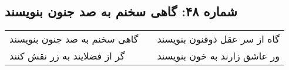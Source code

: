 \begin{center}
\section*{شماره ۴۸: گاهی سخنم به صد جنون بنویسند}
\label{sec:048}
\begin{longtable}{l p{0.5cm} r}
گاهی سخنم به صد جنون بنویسند
&&
گاه از سر عقل ذوفنون بنویسند
\\
گر از فضلایند به زر نقش کنند
&&
ور عاشق زارند به خون بنویسند
\\
\end{longtable}
\end{center}
